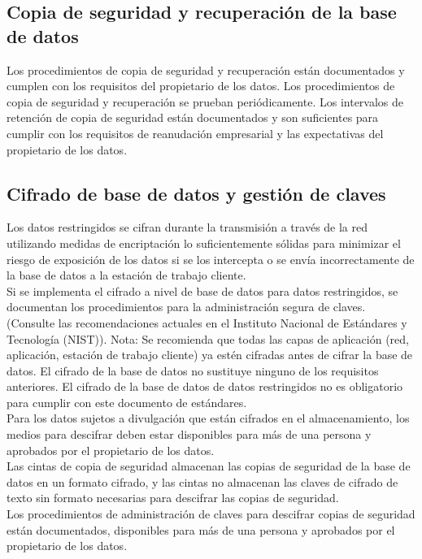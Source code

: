 \subsection{Copia de seguridad y recuperación de la base de datos}
Los procedimientos de copia de seguridad y recuperación están documentados y cumplen con los requisitos del propietario de los datos.           
Los procedimientos de copia de seguridad y recuperación se prueban periódicamente.      
Los intervalos de retención de copia de seguridad están documentados y son suficientes para cumplir con los requisitos de reanudación empresarial y las expectativas del propietario de los datos.  

\subsection{Cifrado de base de datos y gestión de claves}
Los datos restringidos se cifran durante la transmisión a través de la red utilizando medidas de encriptación lo suficientemente sólidas para minimizar el riesgo de exposición de los datos si se los intercepta o se envía incorrectamente de la base de datos a la estación de trabajo cliente.\\
Si se implementa el cifrado a nivel de base de datos para datos restringidos, se documentan los procedimientos para la administración segura de claves. (Consulte las recomendaciones actuales en el Instituto Nacional de Estándares y Tecnología (NIST)).  Nota: Se recomienda que todas las capas de aplicación (red, aplicación, estación de trabajo cliente) ya estén cifradas antes de cifrar la base de datos. El cifrado de la base de datos no sustituye ninguno de los requisitos anteriores. El cifrado de la base de datos de datos restringidos no es obligatorio para cumplir con este documento de estándares.\\
Para los datos sujetos a divulgación que están cifrados en el almacenamiento, los medios para descifrar deben estar disponibles para más de una persona y aprobados por el propietario de los datos.\\
Las cintas de copia de seguridad almacenan las copias de seguridad de la base de datos en un formato cifrado, y las cintas no almacenan las claves de cifrado de texto sin formato necesarias para descifrar las copias de seguridad.\\       
Los procedimientos de administración de claves para descifrar copias de seguridad están documentados, disponibles para más de una persona y aprobados por el propietario de los datos.

